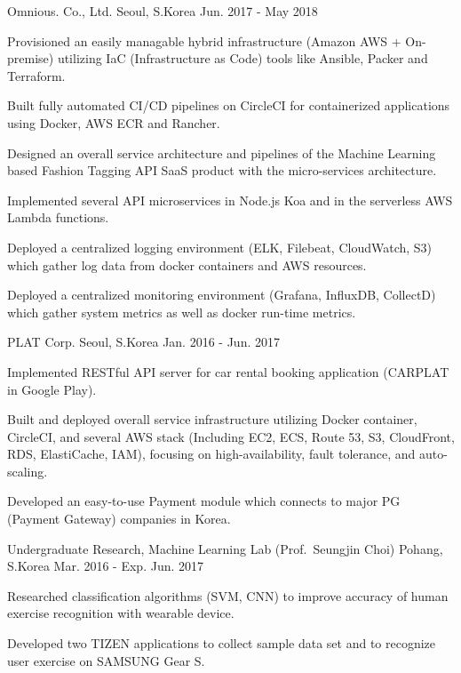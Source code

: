 \begin{cventries}
	{Omnious. Co., Ltd.} %
	{Seoul, S.Korea} %
	{Jun. 2017 - May 2018} %
	{
		\begin{cvitems} %
			\item {Provisioned an easily managable hybrid infrastructure (Amazon AWS + On-premise) utilizing IaC (Infrastructure as Code) tools like Ansible, Packer and Terraform.}
			\item {Built fully automated CI/CD pipelines on CircleCI for containerized applications using Docker, AWS ECR and Rancher.}
			\item {Designed an overall service architecture and pipelines of the Machine Learning based Fashion Tagging API SaaS product with the micro-services architecture.}
			\item {Implemented several API microservices in Node.js Koa and in the serverless AWS Lambda functions.}
			\item {Deployed a centralized logging environment (ELK, Filebeat, CloudWatch, S3) which gather log data from docker containers and AWS resources.}
			\item {Deployed a centralized monitoring environment (Grafana, InfluxDB, CollectD) which gather system metrics as well as docker run-time metrics.}
		\end{cvitems}
	}

	{PLAT Corp.} %
	{Seoul, S.Korea} %
	{Jan. 2016 - Jun. 2017} %
	{
		\begin{cvitems} %
			\item {Implemented RESTful API server for car rental booking application (CARPLAT in Google Play).}
			\item {Built and deployed overall service infrastructure utilizing Docker container, CircleCI, and several AWS stack (Including EC2, ECS, Route 53, S3, CloudFront, RDS, ElastiCache, IAM), focusing on high-availability, fault tolerance, and auto-scaling.}
			\item {Developed an easy-to-use Payment module which connects to major PG (Payment Gateway) companies in Korea.}
		\end{cvitems}
	}

	{Undergraduate Research, Machine Learning Lab (Prof.\ Seungjin Choi)} %
	{Pohang, S.Korea} %
	{Mar. 2016 - Exp. Jun. 2017} %
	{
		\begin{cvitems} %
			\item {Researched classification algorithms (SVM, CNN) to improve accuracy of human exercise recognition with wearable device.}
			\item {Developed two TIZEN applications to collect sample data set and to recognize user exercise on SAMSUNG Gear S.}
		\end{cvitems}
	}


\end{cventries}
